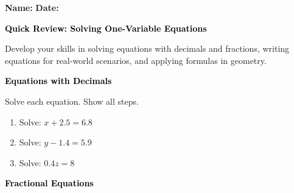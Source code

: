 \documentclass[12pt, letterpaper, fleqn]{article}
\begin{document}
\textbf{Name:} \underline{\hspace{5cm}}
\hfill
\textbf{Date:} \underline{\hspace{3cm}}\\

\begin{tcolorbox}[colback=black!10]
    \large\textcolor{black}{\textbf{Quick Review: Solving One-Variable Equations}}
\end{tcolorbox}

\vspace{3mm}
\noindent
Develop your skills in solving equations with decimals and fractions, writing equations for real-world scenarios, and applying formulas in geometry.

\vspace{4mm}

\begin{tcolorbox}[colback=black!10]
\large\textcolor{black}{\textbf{Equations with Decimals}}
\end{tcolorbox}

\noindent
Solve each equation. Show all steps.

\vspace{3mm}

\begin{enumerate}[itemsep=2.2cm, leftmargin=0.6cm]

\item Solve: $x + 2.5 = 6.8$

\vspace{2cm}

\item Solve: $y - 1.4 = 5.9$

\vspace{2cm}

\item Solve: $0.4z = 8$

\vspace{2cm}

\end{enumerate}

\newpage

\begin{tcolorbox}[colback=black!10]
\large\textcolor{black}{\textbf{Fractional Equations}}
\end{tcolorbox}
\end{document}

